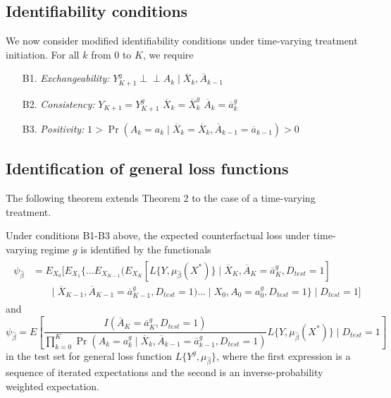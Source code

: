 \subsection{Identifiability conditions}
We now consider modified identifiability conditions under time-varying treatment initiation. For all $k$ from 0 to $K$, we require
\begin{enumerate}
    \item[B1.] \textit{Exchangeability:} $Y^g_{K+1} \perp \!\!\! \perp A_k \mid \overline{X}_k, \overline{A}_{k-1}$
    \item[B2.] \textit{Consistency:} $Y_{K+1} = Y^g_{K+1}$ $\overline{X}_{k} = \overline{X}^g_{k}$  $\overline{A}_k = \overline{a}_k^g$
    \item[B3.] \textit{Positivity:} $1 > \Pr(A_k = a_k \mid \overline{X}_k = \overline{X}_k, \overline{A}_{k -1} = \overline{a}_{k-1}) > 0$
\end{enumerate}

\subsection{Identification of general loss functions}
The following theorem extends Theorem 2 to the case of a time-varying treatment. 
\begin{theorem}
    Under conditions B1-B3 above, the expected counterfactual loss under time-varying regime $g$ is identified by the functionals
    \begin{align}\label{eqn:cl_tv_estimand}
    \begin{split}
        \psi_{\widehat{\beta}} &= E_{X_0}\bigg[E_{X_1}\bigg\{\ldots E_{X_{K-1}}\bigg(E_{X_{K}}[L\{Y, \mu_{\widehat{\beta}}(X^*)\} \mid \overline{X}_K, \overline{A}_K=\overline{a}^g_K, D_{test} = 1] \\
        & \qquad \big\vert\; \overline{X}_{K-1}, \overline{A}_{K-1}=\overline{a}^g_{K-1}, D_{test} = 1\bigg) \ldots \;\big\vert\; X_{0}, A_{0}=a^g_{0}, D_{test} = 1\bigg\}\;\big\vert\; D_{test} = 1\bigg]
    \end{split}
    \end{align}
and 
    \begin{equation}\label{eqn:ipw_tv_estimand}
        \psi_{\widehat{\beta}} = E\left[\frac{I(\overline{A}_K = \overline{a}^g_K, D_{test} = 1)}{\prod_{k=0}^K\Pr(A_k = a^g_k \mid \overline{X}_k, \overline{A}_{k-1} = \overline{a}^g_{k-1}, D_{test} = 1)}L\{Y, \mu_{\widehat{\beta}}(X^*)\} \mid D_{test} = 1\right]
    \end{equation}
in the test set for general loss function $L\{Y^{g}, \mu_{\widehat{\beta}}\}$, where the first expression is a sequence of iterated expectations and the second is an inverse-probability weighted expectation.
\end{theorem}

